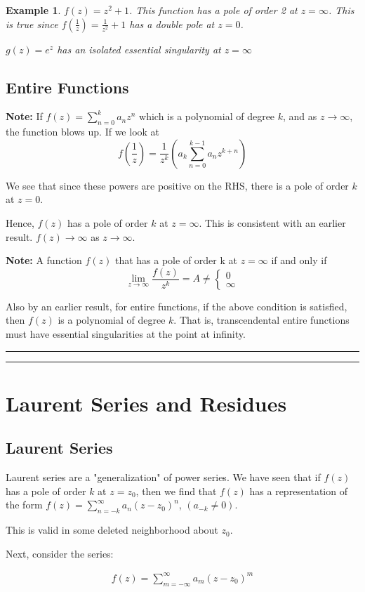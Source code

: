 \documentclass{article}
\newtheorem{ex}{Example}
\theoremstyle{definition}
\newcommand{\Section}[1]{\hrule\hrule\section{#1}}
\begin{document}
\begin{ex}
	$f(z) = z^2+1$. This function has a pole of order 2 at $z=\infty$. This is true since $f(\frac{1}{z}) = \frac{1}{z^2}+1$ has a double pole at $z=0$. 
	
	$g(z) = e^z$ has an isolated essential singularity at $z=\infty$
\end{ex}

\subsection{Entire Functions}

\textbf{Note:} If $f(z) = \sum_{n=0}^k a_nz^n$ which is a polynomial of degree $k$, and as $z \to \infty$, the function blows up. If we look at 
$$f(\frac{1}{z}) = \frac{1}{z^k}\left(a_k \sum_{n=0}^{k-1} a_n z^{k+n}\right)$$

We see that since these powers are positive on the RHS, there is a pole of order $k$ at $z=0$. 

Hence, $f(z)$ has a pole of order $k$ at $z=\infty$. This is consistent with an earlier result. $f(z) \to \infty$ as $z \to \infty$. 

\textbf{Note: } A function $f(z)$ that has a pole of order k at $z= \infty$ if and only if 
$$\lim_{z\to\infty} \frac{f(z)}{z^k} = A \neq \begin{cases}
0 \\ \infty 
\end{cases}$$


Also by an earlier result, for entire functions, if the above condition is satisfied, then $f(z)$ is a polynomial of degree $k$. That is, transcendental entire functions must have essential singularities at the point at infinity. 

\Section{Laurent Series and Residues}
\subsection{Laurent Series}
Laurent series are a "generalization" of power series. We have seen that if $f(z)$ has a pole of order $k$ at $z=z_0$, then we find that $f(z)$ has a representation of the form $f(z) = \sum_{n=-k}^\infty a_n(z-z_0)^n$, $(a_{-k} \neq 0)$. 

This is valid in some deleted neighborhood about $z_0$. 

Next, consider the series:

\begin{align*}
f(z) = \sum_{m=-\infty}^{\infty} a_m(z-z_0)^m
\end{align*}
\end{document}
